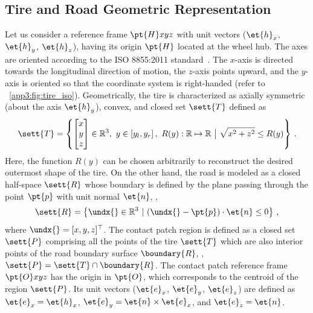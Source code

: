 \subsection{Tire and Road Geometric Representation}
\label{app3:sec:tire_road_representation}

Let us consider a reference frame $\pt{H}xyz$ with unit vectors ($\et{h}_x$, $\et{h}_y$, $\et{h}_z$),  having its origin $\pt{H}$ located at the wheel hub. The axes are oriented according to the ISO 8855:2011 standard~\cite{iso88552011}. The $x$-axis is directed towards the longitudinal direction of motion, the $z$-axis points upward, and the $y$-axis is oriented so that the coordinate system is right-handed (refer to \figurename~\ref{app3:fig:tire_iso}).  Geometrically, the tire is characterized as axially symmetric (about the axis $\et{h}_y$), convex, and closed set $\sett{T}$ defined as
%
\begin{equation}
  \sett{T} = \left\{ \begin{bmatrix} x\\ y\\ z \end{bmatrix} \in \mathbb{R}^3, ~ y \in \left[ y_l, y_r \right], ~ R(y):\mathbb{R} \mapsto \mathbb{R} ~\big|~ \sqrt{x^2+z^2} \leq R(y) \right\} \, \text{.}
\end{equation}
%
Here, the function $R(y)$ can be chosen arbitrarily to reconstruct the desired outermost shape of the tire. On the other hand, the road is modeled as a closed half-space $\sett{R}$ whose boundary is defined by the plane passing through the point $\pt{p}$ with unit normal $\et{n}$, \ie{},
%
\begin{equation}
  \sett{R} = \left\{\undx{}\in\mathbb{R}^3 ~|~ (\undx{}-\pt{p})\cdot\et{n} \leq 0 \right\} \, \text{,}
\end{equation}
%
where $\undx{} = [x,y,z]^\top$. The contact patch region is defined as a closed set $\sett{P}$ comprising all the points of the tire $\sett{T}$ which are also interior points of the road boundary surface $\boundary{R}$, \ie{}, $\sett{P} = \sett{T} \cap \boundary{R}$. The contact patch reference frame $\pt{O}xyz$ has the origin in $\pt{O}$, which corresponds to the centroid of the region $\sett{P}$. Its unit vectors ($\et{e}_x$, $\et{e}_y$, $\et{e}_z$) are defined as $\et{e}_x = \et{h}_x$, $\et{e}_y = \et{n} \times \et{e}_x$, and $\et{e}_z = \et{n}$.

